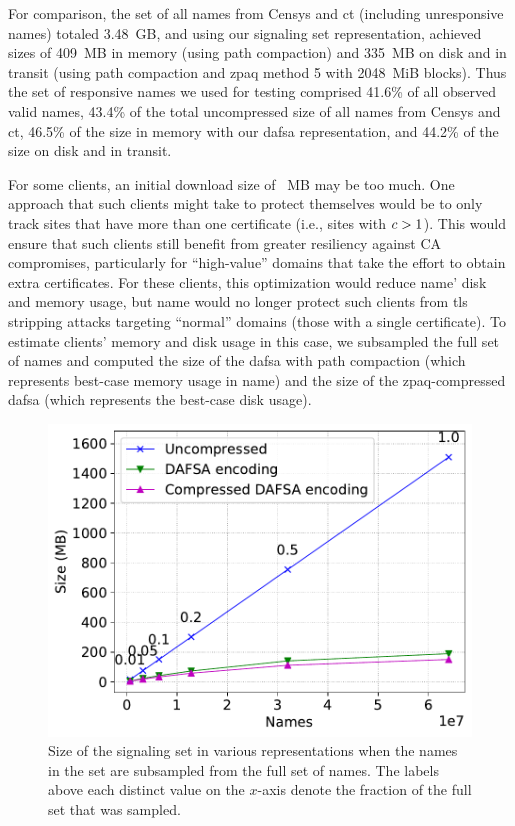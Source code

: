 For comparison, the set of all names from Censys and \ac{ct} (including
unresponsive names) totaled 3.48~GB, and using our signaling set
representation, achieved sizes of 409~MB in memory (using path compaction) and
335~MB on disk and in transit (using path compaction and zpaq method 5 with
2048~MiB blocks). Thus the set of responsive names we used for testing comprised
41.6\% of all observed valid names, 43.4\% of the total uncompressed size of
all names from Censys and \ac{ct}, 46.5\% of the size in memory with our
\ac{dafsa} representation, and 44.2\% of the size on disk and in transit.

For some clients, an initial download size of \fsapczpaqmedsize{}~MB may be too much. One
approach that such clients might take to protect themselves would be to only track
sites that have more than one certificate (i.e., sites with $c > 1$).
This would ensure that such clients still benefit from greater resiliency
against CA compromises, particularly for ``high-value'' domains that take the effort
to obtain extra certificates. 
For these clients, this optimization would reduce \ac{name}' disk and memory usage,
but \ac{name} would no longer protect such clients 
from \ac{tls} stripping attacks targeting
``normal'' domains (those with a single certificate).
To estimate clients' memory and disk usage in this case, we subsampled the full set of names
and computed the size of the \ac{dafsa} with path compaction (which represents
best-case memory usage in \ac{name}) and the size of the zpaq-compressed
\ac{dafsa} (which represents the best-case disk usage).

\begin{figure}[t]
  \centering
  \includegraphics[width=\linewidth]{fig/sample}
  \caption{Size of the signaling set in various representations when 
           the names in the set are subsampled from the full set of names. 
           The labels above each distinct value on the $x$-axis
           denote the fraction of the full set that was sampled.}
  \label{fig:sample}
\end{figure}

